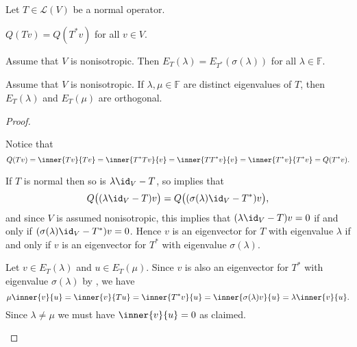 \documentclass[a4paper, 11pt]{memoir}
\theoremstyle{plaincustomnumber}
\theoremstyle{changedotbreakcustomnumber}
\newcommand{\calL}{\mathcal{L}}
\newcommand{\field}{\mathbb{F}}
\begin{document}
\begin{proposition}
    \label{prop:normal-operator-properties}
    Let $T \in \calL(V)$ be a normal operator.
    \begin{enumprop}
        \item \label{enum:normal-adjoint-norm} $Q(Tv) = Q(T^*v)$ for all $v \in V$.
        
        \item \label{enum:normal-adjoint-eigenvalues} Assume that $V$ is nonisotropic. Then $E_T(\lambda) = E_{T^*}(\sigma(\lambda))$ for all $\lambda \in \field$.

        \item \label{enum:normal-orthogonal-eigenspaces} Assume that $V$ is nonisotropic. If $\lambda,\mu \in \mathbb{F}$ are distinct eigenvalues of $T$, then $E_T(\lambda)$ and $E_T(\mu)$ are orthogonal.
    \end{enumprop}
\end{proposition}

\begin{proof}
\begin{proofsec*}
    \item[\Namesubcref{enum:normal-adjoint-norm}]
    Notice that
    \begin{equation*}
        Q(Tv)
            = \inner{Tv}{Tv}
            = \inner{T^*Tv}{v}
            = \inner{TT^*v}{v}
            = \inner{T^*v}{T^*v}
            = Q(T^*v).
    \end{equation*}

    \item[\Namesubcref{enum:normal-adjoint-eigenvalues}]
    If $T$ is normal then so is $\lambda \id_V - T$, so  implies that
    \begin{equation*}
        Q\bigl( (\lambda \id_V - T)v \bigr)
            = Q\bigl( (\sigma(\lambda) \id_V - T^*)v \bigr),
    \end{equation*}
    and since $V$ is assumed nonisotropic, this implies that $(\lambda \id_V - T)v = 0$ if and only if $(\sigma(\lambda) \id_V - T^*)v = 0$. Hence $v$ is an eigenvector for $T$ with eigenvalue $\lambda$ if and only if $v$ is an eigenvector for $T^*$ with eigenvalue $\sigma(\lambda)$.

    \item[\Namesubcref{enum:normal-orthogonal-eigenspaces}]
    Let $v \in E_T(\lambda)$ and $u \in E_T(\mu)$. Since $v$ is also an eigenvector for $T^*$ with eigenvalue $\sigma(\lambda)$ by , we have
    \begin{equation*}
        \mu \inner{v}{u}
            = \inner{v}{Tu}
            = \inner{T^*v}{u}
            = \inner{\sigma(\lambda)v}{u}
            = \lambda \inner{v}{u}.
    \end{equation*}
    Since $\lambda \neq \mu$ we must have $\inner{v}{u} = 0$ as claimed.
\end{proofsec*}
\end{proof}
\end{document}
